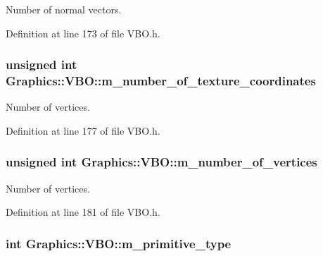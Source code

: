 Number of normal vectors. 



Definition at line 173 of file VBO.h.

\hypertarget{class_graphics_1_1_v_b_o_a085a9d24e4c8b1278730362ea34504e5}{
\subsubsection[{m\_\-number\_\-of\_\-texture\_\-coordinates}]{\setlength{\rightskip}{0pt plus 5cm}unsigned int {\bf Graphics::VBO::m\_\-number\_\-of\_\-texture\_\-coordinates}}}
\label{class_graphics_1_1_v_b_o_a085a9d24e4c8b1278730362ea34504e5}


Number of vertices. 



Definition at line 177 of file VBO.h.

\hypertarget{class_graphics_1_1_v_b_o_ac9ab09212702f66a1941cbd83dc109a6}{
\subsubsection[{m\_\-number\_\-of\_\-vertices}]{\setlength{\rightskip}{0pt plus 5cm}unsigned int {\bf Graphics::VBO::m\_\-number\_\-of\_\-vertices}}}
\label{class_graphics_1_1_v_b_o_ac9ab09212702f66a1941cbd83dc109a6}


Number of vertices. 



Definition at line 181 of file VBO.h.

\hypertarget{class_graphics_1_1_v_b_o_ac19f07fa0f8258b35782d3feee846316}{
\subsubsection[{m\_\-primitive\_\-type}]{\setlength{\rightskip}{0pt plus 5cm}int {\bf Graphics::VBO::m\_\-primitive\_\-type}}}
\label{class_graphics_1_1_v_b_o_ac19f07fa0f8258b35782d3feee846316}


